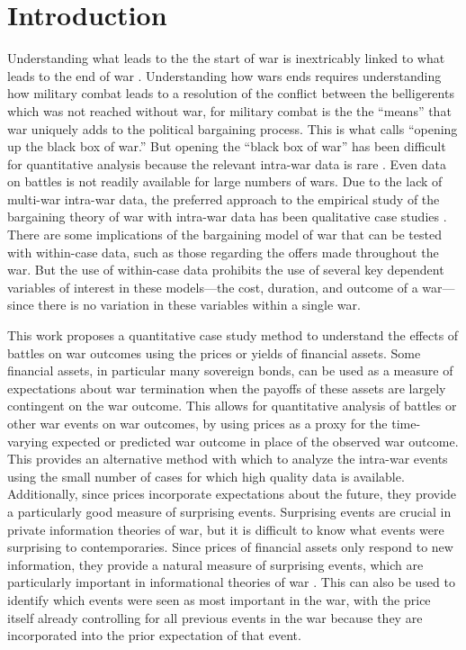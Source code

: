 





\section{Introduction}
\label{sec:introduction}

Understanding what leads to the the start of war is inextricably linked to what leads to the end of war \parencite[x]{Blainey1988}.
Understanding how wars ends requires understanding how military combat leads to a resolution of the conflict between the belligerents which was not reached without war, for military combat is the the ``means'' that war uniquely adds to the political bargaining process.
This is what  \textcite{Gartner1998} calls ``opening up the black box of war.'' 
But opening the ``black box of war'' has been difficult for quantitative analysis because the relevant intra-war data is rare \parencites{Reiter2003}{Reiter2009}.
Even data on battles is not readily available for large numbers of wars.
Due to the lack of multi-war intra-war data, the preferred approach to the empirical study of the bargaining theory of war with intra-war data has been qualitative case studies \parencites{Reiter2003}[][Chapter 9]{Reiter2009}. 
There are some implications of the bargaining model of war that can be tested with within-case data, such as those regarding the offers made throughout the war.
But the use of within-case data prohibits the use of several key dependent variables of interest in these models---the cost, duration, and outcome of a war---since there is no variation in these variables within a single war.

This work proposes a quantitative case study method to understand the effects of battles on war outcomes using the prices or yields of financial assets.
Some financial assets, in particular many sovereign bonds, can be used as a measure of expectations about war termination when the payoffs of these assets are largely contingent on the war outcome.
This allows for quantitative analysis of battles or other war events on war outcomes, by using prices as a proxy for the time-varying expected or predicted war outcome in place of the observed war outcome.
This provides an alternative method with which to analyze the intra-war events using the small number of cases for which high quality data is available.
Additionally, since prices incorporate expectations about the future, they provide a particularly good measure of surprising events. 
Surprising events are crucial in private information theories of war, but it is difficult to know what events were surprising to contemporaries.
Since prices of financial assets only respond to new information, they provide a natural measure of surprising events, which are particularly important in informational theories of war \parencite{Shirkey2009a}.
This can also be used to identify which events were seen as most important in the war, with the price itself already controlling for all previous events in the war because they are incorporated into the prior expectation of that event.

